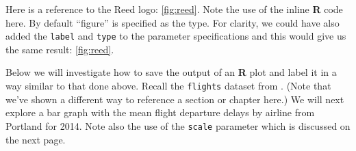 \documentclass[12pt,twoside]{reedthesis}
\begin{document}
  Here is a reference to the Reed logo: \autoref{fig:reed}. Note the use
  of the inline \textbf{R} code here. By default ``figure'' is specified
  as the type. For clarity, we could have also added the \texttt{label}
  and \texttt{type} to the parameter specifications and this would give us
  the same result: \autoref{fig:reed}.
  
  \clearpage 
  
  Below we will investigate how to save the output of an \textbf{R} plot
  and label it in a way similar to that done above. Recall the
  \texttt{flights} dataset from \protect\hyperlink{rmd-basics}{}. (Note
  that we've shown a different way to reference a section or chapter
  here.) We will next explore a bar graph with the mean flight departure
  delays by airline from Portland for 2014. Note also the use of the
  \texttt{scale} parameter which is discussed on the next page.
  
  \begin{Shaded}
  \end{Shaded}
  
  \begin{Shaded}
  \begin{Highlighting}[]
  \NormalTok{(} \NormalTok{, }
         \NormalTok{, }
         \NormalTok{, } \NormalTok{)}
  \end{Highlighting}
  \end{Shaded}
  
\end{document}
